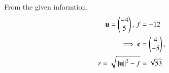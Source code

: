 From the given informtion,
\begin{align}
 \mathbf{u}=\begin{pmatrix}-4\\5\end{pmatrix},\,
 f&=-12\\
\implies \mathbf{c}&=\begin{pmatrix}4 \\ -5\end{pmatrix},\\
	r=\sqrt{\left\lVert\mathbf{u}\right\rVert^2-f}
&=\sqrt{53}
\end{align}

